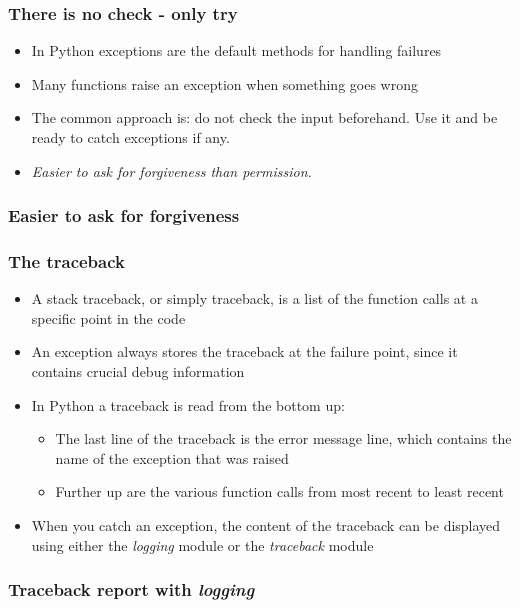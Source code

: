 \documentclass[9pt]{beamer}
\begin{document}
\begin{frame}
  \frametitle{There is no check - only try}
  \begin{itemize}
    \item In Python exceptions are the default methods for handling failures
    \smallskip
    \item Many functions raise an exception when something goes wrong
    \smallskip
    \item The common approach is: do not check the input beforehand. Use it and
          be ready to catch exceptions if any.
    \smallskip
    \item \textit{Easier to ask for forgiveness than permission.}
  \end{itemize}
\end{frame}


\begin{frame}
  \frametitle{Easier to ask for forgiveness}
  
\end{frame}


\begin{frame}
  \frametitle{The traceback}
  \begin{itemize}
    \item A \alert{stack traceback}, or simply traceback, is a list of the
          function calls at a specific point in the code
    \smallskip
    \item An exception always stores the traceback at the failure point, since
          it contains crucial debug information
    \smallskip
    \item In Python a traceback is read from the bottom up:
    \begin{itemize}
    \smallskip
    \item The last line of the traceback is the error message line, which
          contains the name of the exception that was raised
    \smallskip
    \item Further up are the various function calls from most
          recent to least recent
    \end{itemize}
    \medskip
    \item When you catch an exception, the content of the traceback can be
          displayed using either the \emph{logging} module or the
          \emph{traceback} module
  \end{itemize}
\end{frame}


\begin{frame}
  \frametitle{Traceback report with \emph{logging}}
  
\end{frame}
\end{document}

